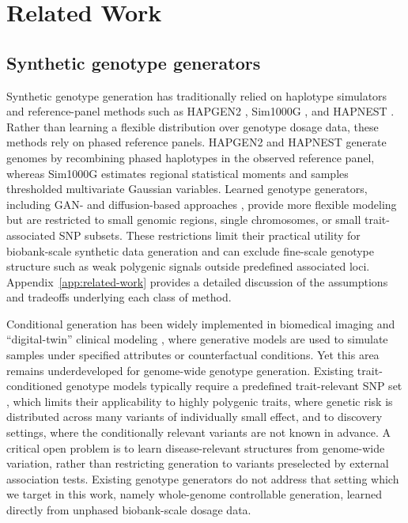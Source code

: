 \documentclass{article}
\begin{document}
\section{Related Work}

\subsection{Synthetic genotype generators}

Synthetic genotype generation has traditionally relied on haplotype simulators and reference-panel methods such as HAPGEN2 \cite{su2011hapgen2}, Sim1000G \cite{dimitromanolakis2019sim1000g}, and HAPNEST \cite{wharrie2023hapnest}. Rather than learning a flexible distribution over genotype dosage data, these methods rely on phased reference panels. HAPGEN2 and HAPNEST generate genomes by recombining phased haplotypes in the observed reference panel, whereas Sim1000G estimates regional statistical moments and samples thresholded multivariate Gaussian variables. Learned genotype generators, including GAN- \cite{yelmenGAN} and diffusion-based approaches \cite{lampis2026snpgen, kenneweg2025generating}, provide more flexible modeling but are restricted to small genomic regions, single chromosomes, or small trait-associated SNP subsets. These restrictions limit their practical utility for biobank-scale synthetic data generation and can exclude fine-scale genotype structure such as weak polygenic signals outside predefined associated loci. Appendix~\ref{app:related-work} provides a detailed discussion of the assumptions and tradeoffs underlying each class of method. 

Conditional generation has been widely implemented in biomedical imaging \cite{frid2018gan, pombo2023equitable, hung2023med, isola2017image} and ``digital-twin'' clinical modeling \cite{shmatko2025learning, urbut2024aladynoulli}, where generative models are used to simulate samples under specified attributes or counterfactual conditions. Yet this area remains underdeveloped for genome-wide genotype generation. Existing trait-conditioned genotype models typically require a predefined trait-relevant SNP set \cite{lampis2026snpgen}, which limits their applicability to highly polygenic traits, where genetic risk is distributed across many variants of individually small effect, and to discovery settings, where the conditionally relevant variants are not known in advance. A critical open problem is to learn disease-relevant structures from genome-wide variation, rather than restricting generation to variants preselected by external association tests. Existing genotype generators do not address that setting which we target in this work, namely whole-genome controllable generation, learned directly from unphased biobank-scale dosage data.
\end{document}
